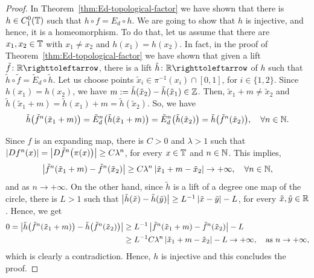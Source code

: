 \begin{proof}
  In Theorem~\ref{thm:Ed-topological-factor} we have shown that there is $h\in C^0_1(\mathbb{T})$ such that $h\circ f=E_d\circ h$. We are going to show that $h$ is injective, and hence, it is a homeomorphism. To do that, let us assume that there are $x_1,x_2\in\mathbb{T}$ with $x_1\neq x_2$ and $h(x_1)=h(x_2)$. In fact, in the proof of Theorem~\ref{thm:Ed-topological-factor} we have shown that given a lift $\tilde f\colon\R\carr$, there is a lift $\tilde h\colon\R\carr$ of $h$ such that $\tilde h\circ\tilde f=\tilde E_d\circ\tilde h$.
  Let us choose points $\tilde x_i\in\pi^{-1}(x_i)\cap [0,1]$, for $i\in\{1,2\}$. Since $h(x_1)=h(x_2)$, we have $m:=\tilde h(\tilde x_2)-\tilde h(\tilde x_1)\in\mathbb{Z}$. Then, $\tilde x_1+m\neq\tilde x_2$ and $\tilde h(\tilde x_1+m)=\tilde h(x_1)+m=\tilde h(\tilde x_2)$. So, we have
  \begin{displaymath}
    \tilde h\big(\tilde f^n(\tilde x_1+m)\big) = \tilde E_d^n\big(\tilde h(\tilde x_1+m)\big) = \tilde E_d^n\big(\tilde h(\tilde x_2)\big) = \tilde h\big(\tilde f^n(\tilde x_2)\big), \quad\forall n\in\mathbb{N}.
  \end{displaymath}

  Since $f$ is an expanding map, there is $C>0$ and $\lambda>1$ such that $\left\lvert{Df^n(x)}\right\rvert=\left\lvert{D\tilde f^n\big(\pi(x)\big)}\right\rvert\geq C\lambda^n$, for every $x\in\mathbb{T}$ and $n\in\mathbb{N}$. This implies,
  \begin{displaymath}
    \left\lvert{\tilde f^n(\tilde x_1+m)-\tilde f^n(\tilde x_2)}\right\rvert\geq C\lambda^n \left\lvert{\tilde x_1+m-\tilde x_2}\right\rvert\to+\infty, \quad\forall n\in\mathbb{N},
  \end{displaymath}
  and as $n\to+\infty$. On the other hand, since $\tilde h$ is a lift of a degree one map of the circle, there is $L>1$ such that $\left\lvert{\tilde h(\tilde x)-\tilde h(\tilde y)}\right\rvert\geq L^{-1}\left\lvert{\tilde x-\tilde y}\right\rvert-L$, for every $\tilde x,\tilde y\in\mathbb{R}$. Hence, we get
  \begin{displaymath}
    \begin{split}
      0=\left\lvert{\tilde h\big(\tilde f^n(\tilde x_1+m)\big)-\tilde h\big(\tilde f^n(\tilde x_2)\big)}\right\rvert &\geq L^{-1}\left\lvert{\tilde f^n(\tilde x_1+m)-\tilde f^n(\tilde x_2)}\right\rvert - L\\
      &\geq L^{-1}C\lambda^n \left\lvert{\tilde x_1+m-\tilde x_2}\right\rvert - L \to +\infty, \quad\text{as } n\to+\infty,
    \end{split}
  \end{displaymath}
  which is clearly a contradiction. Hence, $h$ is injective and this concludes the proof.
\end{proof}


